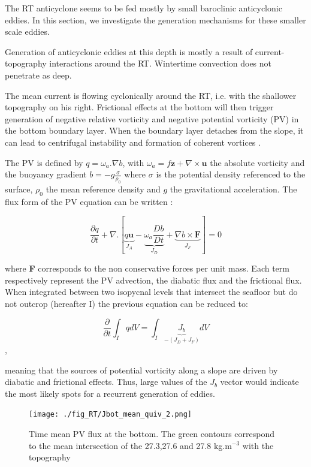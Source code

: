 \documentclass[11pt,a4paper]{article}
\begin{document}
The RT anticyclone seems to be fed mostly by small baroclinic anticyclonic eddies. In this section, we investigate the generation mechanisms for these smaller scale eddies.

Generation of anticyclonic eddies at this depth is mostly a result of current-topography interactions around the RT. Wintertime convection does not penetrate as deep.

The mean current is flowing cyclonically around the RT, i.e. with the shallower topography on his right. Frictional effects at the bottom will then trigger generation of negative relative vorticity and negative potential vorticity (PV) in the bottom boundary layer. When the boundary layer detaches from the slope, it can lead to centrifugal instability and formation of coherent vortices \cite{molemaker, gula16}.


The PV is defined by $q = \omega _a.\nabla b$, with $\omega _a = f\textbf{z}+\nabla \times \textbf{u}$ the absolute vorticity and the buoyancy gradient $b = -g\frac{\sigma}{\rho _0}$ where $\sigma$ is the potential density referenced to the surface, $\rho _0$ the mean reference density and $g$ the gravitational acceleration. The flux form of the PV equation can be written \cite{gula19}:

$$\frac{\partial q}{\partial t} + \nabla.[\underbrace{q\textbf{u}}_{J_A} - \underbrace{\omega _a\frac{D b}{D t}}_{J_D}+\underbrace{\nabla b \times \textbf{F}}_{J_F}] = 0$$

where \textbf{F} corresponds to the non conservative forces per unit mass. Each term respectively represent the PV advection, the diabatic flux and the frictional flux. When integrated between two isopycnal levels that intersect the seafloor but do not outcrop (hereafter I) the previous equation can be reduced to:

$$\frac{\partial}{\partial t} \int _I q dV= \int _I \underbrace{J_b}_{-(J_D+J_F)} dV$$,

meaning that the sources of potential vorticity along a slope are driven by diabatic and frictional effects. Thus, large values of the $J_b$ vector would indicate the most likely spots for a recurrent generation of eddies.

\begin{figure}[H]
\centerline{\texttt{[image: ./fig\_RT/Jbot\_mean\_quiv\_2.png]}}
\caption{Time mean PV flux at the bottom. The green contours correspond to the mean intersection of the 27.3,27.6 and 27.8 kg.m$^{-3}$ with the topography}
\label{pv_flux}
\end{figure}
\end{document}
